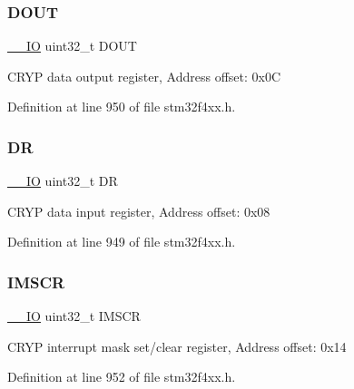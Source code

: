 \subsubsection{\texorpdfstring{D\+O\+UT}{DOUT}}
{\footnotesize\ttfamily \hyperlink{group___c_m_s_i_s__core__definitions_gaec43007d9998a0a0e01faede4133d6be}{\+\_\+\+\_\+\+IO} uint32\+\_\+t D\+O\+UT}

C\+R\+YP data output register, Address offset\+: 0x0C 

Definition at line 950 of file stm32f4xx.\+h.

\mbox{\label{struct_c_r_y_p___type_def_a3df0d8dfcd1ec958659ffe21eb64fa94}} 
\subsubsection{\texorpdfstring{DR}{DR}}
{\footnotesize\ttfamily \hyperlink{group___c_m_s_i_s__core__definitions_gaec43007d9998a0a0e01faede4133d6be}{\+\_\+\+\_\+\+IO} uint32\+\_\+t DR}

C\+R\+YP data input register, Address offset\+: 0x08 

Definition at line 949 of file stm32f4xx.\+h.

\mbox{\label{struct_c_r_y_p___type_def_adcdd7c23a99f81c21dae2e9f989632e1}} 
\subsubsection{\texorpdfstring{I\+M\+S\+CR}{IMSCR}}
{\footnotesize\ttfamily \hyperlink{group___c_m_s_i_s__core__definitions_gaec43007d9998a0a0e01faede4133d6be}{\+\_\+\+\_\+\+IO} uint32\+\_\+t I\+M\+S\+CR}

C\+R\+YP interrupt mask set/clear register, Address offset\+: 0x14 

Definition at line 952 of file stm32f4xx.\+h.

\mbox{\label{struct_c_r_y_p___type_def_ab1efba4cdf22c525fce804375961d567}} 
